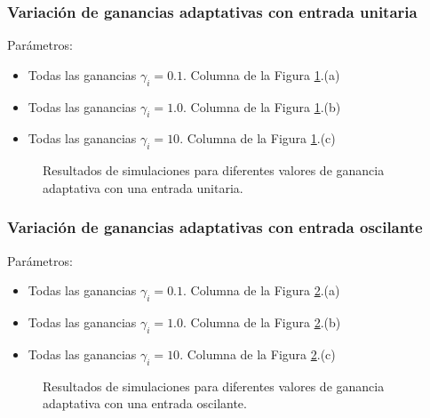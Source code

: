 \documentclass[letterpaper,11pt]{article} %
\begin{document}
\subsubsection{Variación de ganancias adaptativas con entrada unitaria}
Parámetros:
\begin{itemize}
	\item Todas las ganancias $\gamma_i = 0.1$. Columna de la Figura \ref{gananciasrl}.(a)
	\item Todas las ganancias $\gamma_i = 1.0$. Columna de la Figura \ref{gananciasrl}.(b)
	\item Todas las ganancias $\gamma_i = 10$. Columna de la Figura \ref{gananciasrl}.(c)
\end{itemize}
\newpage
\begin{figure}[h]
	\centering
	\captionsetup{justification=centering}
	\newline
	\noindent
	\newline
	\noindent
	\addtocounter{figure}{-1}  
	\caption{Resultados de simulaciones para diferentes valores de ganancia adaptativa con una entrada unitaria.}
	\label{gananciasrl}
\end{figure}

\subsubsection{Variación de ganancias adaptativas con entrada oscilante}
Parámetros:
\begin{itemize}
	\item Todas las ganancias $\gamma_i = 0.1$. Columna de la Figura \ref{gananciasrs}.(a)
	\item Todas las ganancias $\gamma_i = 1.0$. Columna de la Figura \ref{gananciasrs}.(b)
	\item Todas las ganancias $\gamma_i = 10$. Columna de la Figura \ref{gananciasrs}.(c)
\end{itemize}
\newpage
\begin{figure}[h]
	\centering
	\captionsetup{justification=centering}
	\newline
	\noindent
	\newline
	\noindent
	\addtocounter{figure}{-1}  
	\caption{Resultados de simulaciones para diferentes valores de ganancia adaptativa con una entrada oscilante.}
	\label{gananciasrs}
\end{figure}
\end{document}
